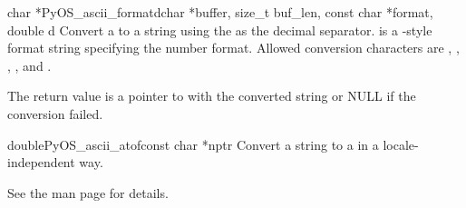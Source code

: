 \begin{cfuncdesc}{char *}{PyOS_ascii_formatd}{char *buffer, size_t buf_len,
                                              const char *format, double d}
Convert a  to a string using the  as the
decimal separator.  is a -style format
string specifying the number format. Allowed conversion characters are
, , , ,
 and .

The return value is a pointer to  with the converted
string or NULL if the conversion failed. 
\end{cfuncdesc}

\begin{cfuncdesc}{double}{PyOS_ascii_atof}{const char *nptr}
Convert a string to a  in a locale-independent
way. 

See the \UNIX{} man page  for details.
\end{cfuncdesc}
